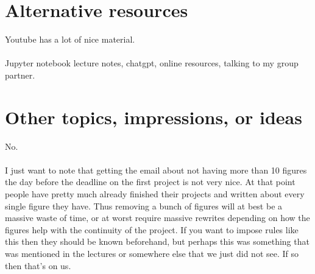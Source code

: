 \documentclass[12pt]{article}
\begin{document}
	\vspace{2cm}
	
	\section*{Alternative resources}
	\noindent
	Youtube has a lot of nice material.
	\\\\
	Jupyter notebook lecture notes, chatgpt, online resources, talking to my group partner.
	
	\vspace{2cm}
	
	\section*{Other topics, impressions, or ideas}
	\noindent
	No.
	\\\\
	I just want to note that getting the email about not having more than 10 figures the day before the deadline on the first project is not very nice. At that point people have pretty much already finished their projects and written about every single figure they have. Thus removing a bunch of figures will at best be a massive waste of time, or at worst require massive rewrites depending on how the figures help with the continuity of the project. If you want to impose rules like this then they should be known beforehand, but perhaps this was something that was mentioned in the lectures or somewhere else that we just did not see. If so then that's on us.
	
	\vspace{2cm}
	
\end{document}
